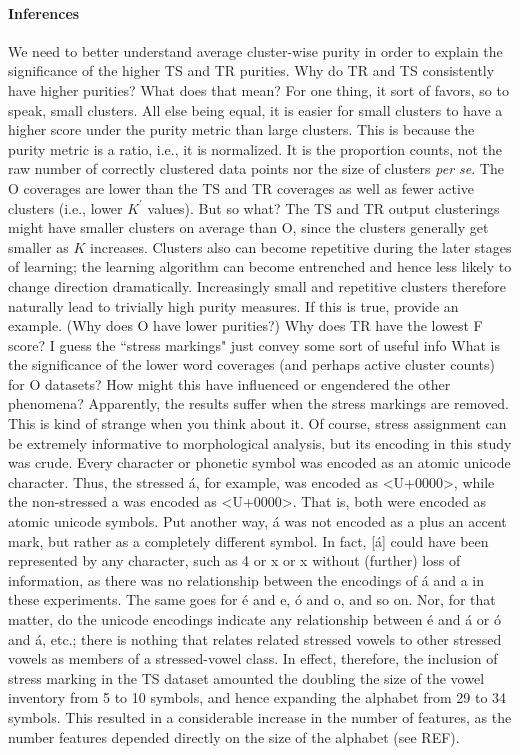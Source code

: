 \paragraph{Inferences}
We need to better understand average cluster-wise purity in order to explain the significance of the higher 
TS and TR purities. Why do TR and TS consistently have higher purities? What does that mean? 
For one thing, 
it sort of favors, so to speak, small clusters. 
All else being equal, it is easier for small clusters to have a higher score under the purity metric than large clusters.
This is because the purity metric is a ratio, i.e., it is normalized. It is the proportion counts, 
not the raw number of correctly clustered data points nor the size of clusters \emph{per se}. 
The O coverages are lower than the TS and TR coverages as well as fewer active clusters 
(i.e., lower $K^{\prime}$ values). But so what? The TS and TR output clusterings 
might have smaller clusters on average than O, since the clusters generally get smaller as $K$ increases. 
Clusters also can become repetitive during the later stages of learning; the learning algorithm can become 
entrenched and hence less likely to change direction dramatically. 
Increasingly small and repetitive clusters therefore naturally lead to trivially high purity measures. 
If this is true, provide an example.
(Why does O have lower purities?)
Why does TR have the lowest F score? I guess the ``stress markings" just convey some sort of useful info
What is the significance of the lower word coverages (and perhaps active cluster counts) for O datasets? How might this have influenced or engendered the other phenomena?
Apparently, the results suffer when the stress markings are removed. This is kind of strange when you think about it. 
Of course, stress assignment can be extremely informative to morphological analysis, but its encoding
in this study was crude. Every character or phonetic symbol was encoded as an atomic unicode character. Thus, the stressed \'a, for example, was encoded as <U+0000>, while the 
 non-stressed a was encoded as <U+0000>. That is, both were encoded as atomic unicode symbols. 
 Put another way, \'a was not encoded as a plus an accent mark, but rather as a completely different symbol. 
 In fact, [\'a] could have been 
 represented by any character, such as 4 or x or x without (further) loss of information, as there was no 
 relationship between the encodings of \'a and a in these experiments. The same goes for \'e and e, \'o and o, and so on. 
 Nor, for that matter, do the unicode encodings indicate any relationship between \'e and \'a or \'o and \'a, etc.; there is nothing 
that relates related stressed vowels to other stressed vowels as members of a stressed-vowel class. In effect, therefore, the inclusion of stress marking in the TS dataset amounted the doubling the size of the vowel inventory from 5 to 10 symbols, and hence expanding the alphabet from 29 to 34 symbols. This resulted in a considerable increase in the number of features, as the number features depended directly on the size of the alphabet (see REF). 

